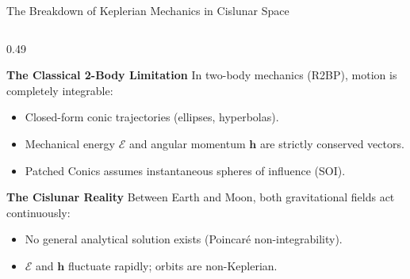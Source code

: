 \documentclass[aspectratio=169, 10pt]{beamer}
\begin{document}
\begin{frame}{The Breakdown of Keplerian Mechanics in Cislunar Space}
    \begin{columns}[t]
        \begin{column}{0.49\textwidth}
            \begin{block}{\textbf{The Classical 2-Body Limitation}}
                \scriptsize
                In two-body mechanics (R2BP), motion is completely integrable:
                \begin{itemize}\setlength{\itemsep}{1.5pt}
                    \item Closed-form conic trajectories (ellipses, hyperbolas).
                    \item Mechanical energy $\mathcal{E}$ and angular momentum $\mathbf{h}$ are strictly conserved vectors.
                    \item Patched Conics assumes instantaneous spheres of influence (SOI).
                \end{itemize}
            \end{block}
            \vspace{-0.15cm}
            \begin{alertblock}{\textbf{The Cislunar Reality}}
                \scriptsize
                Between Earth and Moon, both gravitational fields act continuously:
                \begin{itemize}\setlength{\itemsep}{1.5pt}
                    \item No general analytical solution exists (Poincaré non-integrability).
                    \item $\mathcal{E}$ and $\mathbf{h}$ fluctuate rapidly; orbits are non-Keplerian.
                \end{itemize}
            \end{alertblock}
        \end{column}
        

\end{columns}
\end{frame}
\end{document}
